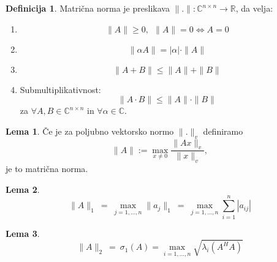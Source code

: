 \documentclass[11pt]{article}
\theoremstyle{definition}
\newtheorem{definicija}{Definicija}[section]
\newtheorem{lema}{Lema}
\begin{document}
\begin{definicija}

Matrična norma je preslikava $\|.\|: \mathbb{C}^{n \times n} \rightarrow \mathbb{R}$, da velja:
\begin{enumerate}
	\item[1)] $$\|A\| \geq 0, ~~\|A\| = 0 \Leftrightarrow A = 0$$
	\item[2)] $$\|\alpha A\| = |\alpha| \cdot \|A\|$$
	\item[3)] $$\|A + B\| \leq \|A\| + \|B\|$$
	\item[4)] Submultiplikativnost:
	$$\|A \cdot B\| \leq \|A\| \cdot \|B\|$$
	za $\forall A, B \in \mathbb{C}^{n \times n}$ in $\forall \alpha \in \mathbb{C}$.
\end{enumerate}

\end{definicija}
\vspace{0.5cm}

\begin{lema}

Če je za poljubno vektorsko normo $\|.\|_v$ definiramo 
$$\|A\| := \max_{x \neq 0} \frac{\|Ax\|_v}{\|x\|_v},$$
je to matrična norma.

\end{lema}
\vspace{0.5cm}

\begin{lema}

$$\|A\|_1 ~=~ \max_{j = 1, \ldots, n} \|a_j\|_1 ~=~ \max_{j = 1, \ldots, n} \sum_{i=1}^n |a_{ij}|$$

\end{lema}
\vspace{0.5cm}

\begin{lema}

$$\|A\|_2 ~=~ \sigma_1 (A) = \max_{i = 1, \ldots, n} \sqrt{\lambda_i (A^H A)}$$

\end{lema}
\vspace{0.5cm}


\end{document}
